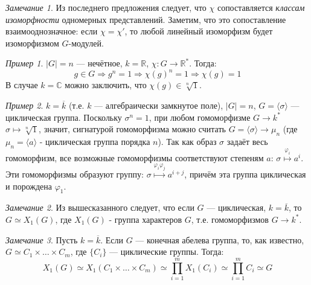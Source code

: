 \documentclass{article}
\theoremstyle{definition}
\theoremstyle{remark}
\newtheorem*{remark}{Замечание}
\newtheorem*{example}{Пример}
\newcommand{\Ra}{\Rightarrow}
\newcommand{\R}{\mathbb{R}}
\renewcommand{\C}{\mathbb{C}}
\begin{document}
\begin{remark}
    Из последнего предложения следует, что $\chi$ сопоставляется \textit{классам изоморфности} одномерных представлений. Заметим, что это сопоставление взаимооднозначное: если $\chi = \chi'$, то любой линейный изоморфизм будет изоморфизмом $G$-модулей. 
\end{remark}

\begin{example}
    $|G| = n$ --- нечётное, $k = \R$, $\chi: G \to \R^*$. Тогда:
    \[
        g \in G \Ra g^n = 1 \Ra \chi(g)^n = 1 \Ra \chi(g) = 1
    \]
    В случае $k = \C$ можно заключить, что $\chi(g) \in \sqrt[n]{1}$.
\end{example}

\begin{example}
    $k = \overline{k}$ (т.е. $k$ --- алгебраически замкнутое поле), $|G| = n$, $G = \langle \sigma \rangle$ --- циклическая группа. Поскольку $\sigma^n = 1$, при любом гомоморфизме $G \to k^*$ $\sigma \mapsto \sqrt[n]{1}$, значит, сигнатурой гомоморфизма можно считать $G = \langle \sigma \rangle \to \mu_n$ (где $\mu_n = \langle a \rangle$ - циклическая группа порядка $n$). Так как образ $\sigma$ задаёт весь гомоморфизм, все возможные гомоморфизмы соответствуют степеням $a$: $\sigma \overset{\varphi_i}{\longmapsto} a^i$. Эти гомоморфизмы образуют группу: $\sigma \overset{\varphi_i \varphi_j}{\longmapsto} a^{i + j}$, причём эта группа циклическая и порождена $\varphi_1$.
\end{example}

\begin{remark}
    Из вышесказанного следует, что если $G$ --- циклическая, $k = \overline{k}$, то $G \simeq X_1(G)$, где $X_1(G)$ - группа характеров $G$, т.е. гомоморфизмов $G \to k^*$.
\end{remark}

\begin{remark}
    Пусть $k = \overline{k}$. Если $G$ --- конечная абелева группа, то, как известно, $G \simeq C_1 \times \hdots \times C_m$, где $\{C_i\}$ --- циклические группы. Тогда:
    \[
        X_1(G) \simeq X_1(C_1 \times \hdots \times C_m) \simeq \prod_{i = 1}^m X_1(C_i) \simeq \prod_{i = 1}^m C_i \simeq G
    \]
\end{remark}
\end{document}
